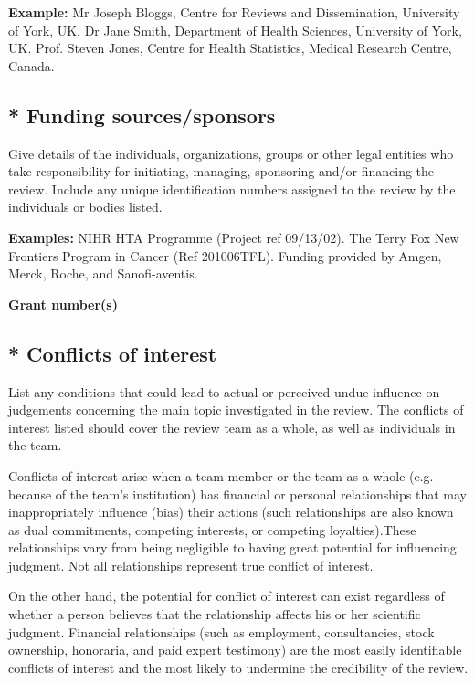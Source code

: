 \documentclass{qqtarticle}
\begin{document}
    \textbf{Example:} Mr Joseph Bloggs, Centre for Reviews and Dissemination, University of York, UK. Dr Jane Smith, Department
    of Health Sciences, University of York, UK. Prof. Steven Jones, Centre for Health Statistics, Medical Research Centre,
    Canada.

    \subsection{* Funding sources/sponsors}
    Give details of the individuals, organizations, groups or other legal entities who take responsibility for initiating, managing,
    sponsoring and/or financing the review. Include any unique identification numbers assigned to the review by the individuals
    or bodies listed.

    \textbf{Examples:} NIHR HTA Programme (Project ref 09/13/02). The Terry Fox New Frontiers Program in Cancer (Ref
    201006TFL). Funding provided by Amgen, Merck, Roche, and Sanofi-aventis.

    \textbf{Grant number(s)}

    \subsection{* Conflicts of interest}
    List any conditions that could lead to actual or perceived undue influence on judgements concerning the main topic
    investigated in the review. The conflicts of interest listed should cover the review team as a whole, as well as individuals in
    the team.

    Conflicts of interest arise when a team member or the team as a whole (e.g. because of the team’s institution) has financial
    or personal relationships that may inappropriately influence (bias) their actions (such relationships are also known as dual
    commitments, competing interests, or competing loyalties).These relationships vary from being negligible to having great
    potential for influencing judgment. Not all relationships represent true conflict of interest.

    On the other hand, the potential for conflict of interest can exist regardless of whether a person believes that the
    relationship affects his or her scientific judgment. Financial relationships (such as employment, consultancies, stock
    ownership, honoraria, and paid expert testimony) are the most easily identifiable conflicts of interest and the most likely to
    undermine the credibility of the review.
\end{document}
